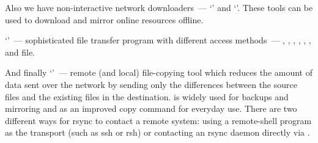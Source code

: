 Also we have non-interactive network downloaders~--- `' and `'.
These tools can be used to download and mirror online resources offline.

`'~--- sophisticated file transfer program with different access
methods~--- , , , ,
, ,  and file.

And finally `'~--- remote (and local) file-copying tool which reduces
the amount  of  data  sent over the network by sending only the differences
between the source files and the existing files in the destination.
 is widely used for backups and  mirroring and as an improved
copy command for everyday use. There  are two different ways for rsync
to contact a remote system: using a remote-shell program as the transport
(such as ssh or rsh) or contacting an rsync daemon directly via .
